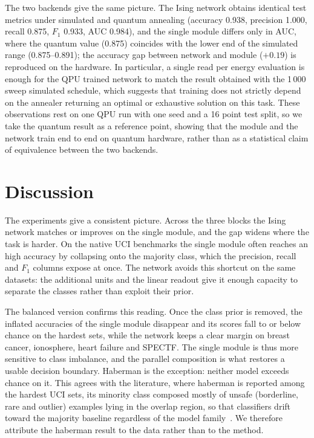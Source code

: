 \documentclass{ieeeaccess}
\begin{document}
The two backends give the same picture. The Ising network obtains
identical test metrics under simulated and quantum annealing (accuracy
0.938, precision 1.000, recall 0.875, $F_1$ 0.933, AUC 0.984), and the
single module differs only in AUC, where the quantum value (0.875)
coincides with the lower end of the simulated range (0.875--0.891); the
accuracy gap between network and module ($+0.19$) is reproduced on the
hardware. In particular, a single read per energy evaluation is enough
for the QPU trained network to match the result obtained with the
1\,000 sweep simulated schedule, which suggests that training does not
strictly depend on the annealer returning an optimal or exhaustive
solution on this task. These observations rest on one QPU run with one
seed and a 16 point test split, so we take the quantum result as a
reference point, showing that the module and the network train
end to end on quantum hardware, rather than as a statistical claim of
equivalence between the two backends.


\section{Discussion}\label{sec:discussion}

The experiments give a consistent picture. Across the three blocks the
Ising network matches or improves on the single module, and the gap widens
where the task is harder. On the native UCI benchmarks the single module often
reaches an high accuracy by collapsing onto the majority class,
which the precision, recall and $F_1$ columns expose at once. The network
avoids this shortcut on the same datasets: the additional units and the linear
readout give it enough capacity to separate the classes rather than exploit
their prior.

The balanced version confirms this reading. Once the class prior is removed,
the inflated accuracies of the single module disappear and its scores fall to
or below chance on the hardest sets, while the network keeps a clear margin on
breast cancer, ionosphere, heart failure and SPECTF. The single module is thus
more sensitive to class imbalance, and the parallel
composition is what restores a usable decision boundary.
Haberman is the
exception: neither model exceeds chance on it. This agrees with the
literature, where haberman is reported among the hardest UCI sets, its minority
class composed mostly of unsafe (borderline, rare and outlier) examples lying
in the overlap region, so that classifiers drift toward the majority baseline
regardless of the model family~\cite{Napierala2016types}. We therefore
attribute the haberman result to the data rather than to the method.
\end{document}
